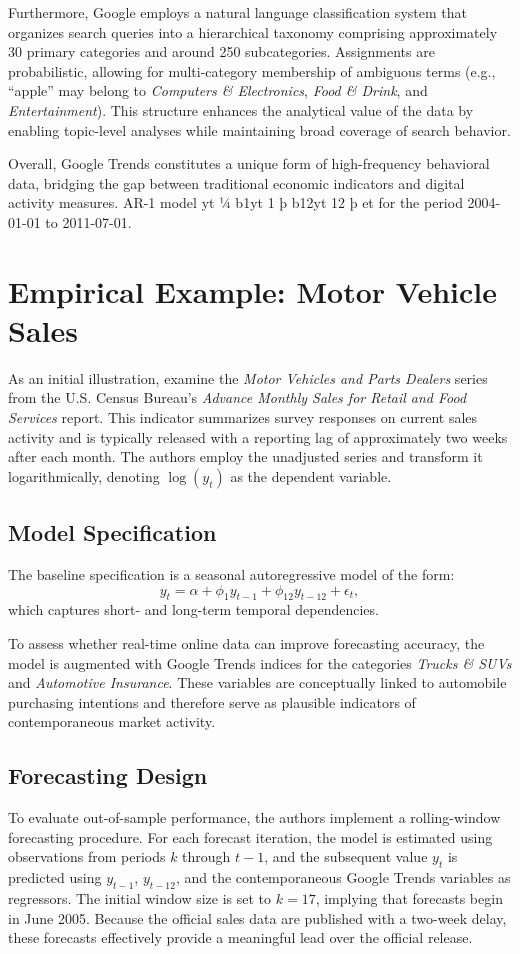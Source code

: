 \documentclass{article}
\begin{document}
Furthermore, Google employs a natural language classification system that organizes search queries into a hierarchical taxonomy comprising approximately 30 primary categories and around 250 subcategories. 
Assignments are probabilistic, allowing for multi-category membership of ambiguous terms (e.g., ``apple'' may belong to \textit{Computers \& Electronics}, \textit{Food \& Drink}, and \textit{Entertainment}). 
This structure enhances the analytical value of the data by enabling topic-level analyses while maintaining broad coverage of search behavior.

Overall, Google Trends constitutes a unique form of high-frequency behavioral data, bridging the gap between traditional economic indicators and digital activity measures.
AR-1 model yt ¼ b1yt 1 þ b12yt 12 þ et for the
period 2004-01-01 to 2011-07-01. 


\section{Empirical Example: Motor Vehicle Sales}

As an initial illustration, \textcite{ChoiVarian2012} examine the \textit{Motor Vehicles and Parts Dealers} series from the U.S. Census Bureau's \textit{Advance Monthly Sales for Retail and Food Services} report. 
This indicator summarizes survey responses on current sales activity and is typically released with a reporting lag of approximately two weeks after each month. 
The authors employ the unadjusted series and transform it logarithmically, denoting $\log(y_t)$ as the dependent variable.

\subsection{Model Specification}
The baseline specification is a seasonal autoregressive model of the form:
\[
y_t = \alpha + \phi_1 y_{t-1} + \phi_{12} y_{t-12} + \epsilon_t,
\]
which captures short- and long-term temporal dependencies. 

To assess whether real-time online data can improve forecasting accuracy, the model is augmented with Google Trends indices for the categories \textit{Trucks \& SUVs} and \textit{Automotive Insurance}. 
These variables are conceptually linked to automobile purchasing intentions and therefore serve as plausible indicators of contemporaneous market activity.

\subsection{Forecasting Design}
To evaluate out-of-sample performance, the authors implement a rolling-window forecasting procedure. 
For each forecast iteration, the model is estimated using observations from periods $k$ through $t-1$, and the subsequent value $y_t$ is predicted using $y_{t-1}$, $y_{t-12}$, and the contemporaneous Google Trends variables as regressors. 
The initial window size is set to $k = 17$, implying that forecasts begin in June 2005. 
Because the official sales data are published with a two-week delay, these forecasts effectively provide a meaningful lead over the official release.
\end{document}
